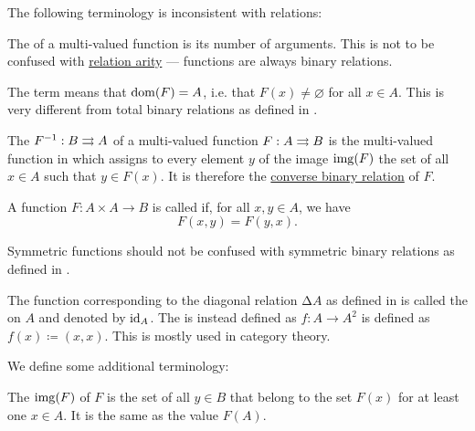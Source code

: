 \begin{definition}
  The following terminology is inconsistent with relations:
  \begin{thmenum}[resume=def:multi_valued_function]
     The  of a multi-valued function is its number of arguments. This is not to be confused with \hyperref[def:relation/arity]{relation arity} --- functions are always binary relations.

     The term  means that \( \operatorname{dom}(F) = A \), i.e. that \( F(x) \neq \varnothing \) for all \( x \in A \). This is very different from total binary relations as defined in .

     The  \( F^{-1}: B \rightrightarrows A \) of a multi-valued function \( F: A \rightrightarrows B \) is the multi-valued function in which assigns to every element \( y \) of the image \( \operatorname{img}(F) \) the set of all \( x \in A \) such that \( y \in F(x) \). It is therefore the \hyperref[def:binary_relation/converse]{converse binary relation} of \( F \).

     A function \( F: A \times A \to B \) is called  if, for all \( x, y \in A \), we have
    \begin{equation*}
      F(x, y) = F(y, x).
    \end{equation*}

    Symmetric functions should not be confused with symmetric binary relations as defined in .

     The function corresponding to the diagonal relation \( \increment A \) as defined in  is called the  on \( A \) and denoted by \( \operatorname{id}_A \). The  is instead defined as \( f: A \to A^2 \) is defined as \( f(x) \coloneqq (x, x) \). This is mostly used in category theory.
  \end{thmenum}

  We define some additional terminology:
  \begin{thmenum}[resume=def:multi_valued_function]
     The  \( \operatorname{img}(F) \) of \( F \) is the set of all \( y \in B \) that belong to the set \( F(x) \) for at least one \( x \in A \). It is the same as the value \( F(A) \).


\end{thmenum}
\end{definition}
